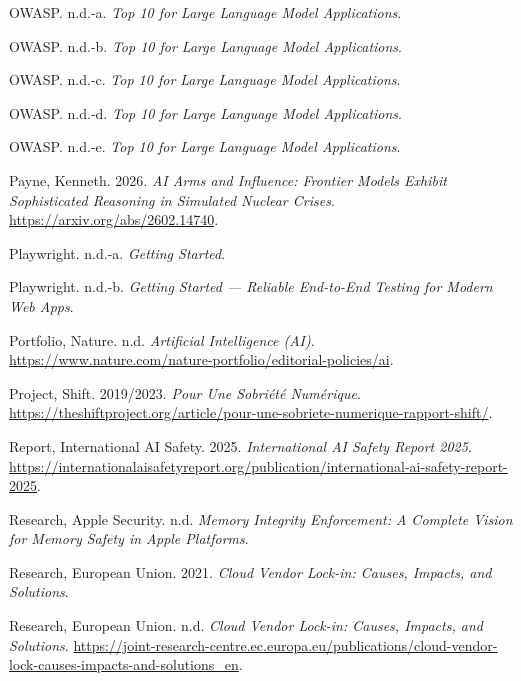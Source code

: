 \documentclass[
  10pt,
  a4paper,
  DIV=11,
  numbers=noendperiod,
  oneside]{scrreprt}
\newlength{\cslhangindent}
\newenvironment{CSLReferences}[2] %
 {\begin{list}{}{%
  \setlength{\itemindent}{0pt}
  \setlength{\leftmargin}{0pt}
  \setlength{\parsep}{0pt}
  \ifodd #1
   \setlength{\leftmargin}{\cslhangindent}
   \setlength{\itemindent}{-1\cslhangindent}
  \fi
  \setlength{\itemsep}{#2\baselineskip}}}
 {\end{list}}
\let\oldemph\emph
\renewcommand{\emph}[1]{\oldemph{\textcolor{cmmgray}{#1}}}
\begin{document}
\begin{CSLReferences}{1}{1}
OWASP. n.d.-a. \emph{Top 10 for Large Language Model Applications}.

OWASP. n.d.-b. \emph{Top 10 for Large Language Model Applications}.

OWASP. n.d.-c. \emph{Top 10 for Large Language Model Applications}.

OWASP. n.d.-d. \emph{Top 10 for Large Language Model Applications}.

OWASP. n.d.-e. \emph{Top 10 for Large Language Model Applications}.

Payne, Kenneth. 2026. \emph{AI Arms and Influence: Frontier Models
Exhibit Sophisticated Reasoning in Simulated Nuclear Crises}.
\url{https://arxiv.org/abs/2602.14740}.

Playwright. n.d.-a. \emph{Getting Started}.

Playwright. n.d.-b. \emph{Getting Started --- Reliable End-to-End
Testing for Modern Web Apps}.

Portfolio, Nature. n.d. \emph{Artificial Intelligence (AI)}.
\url{https://www.nature.com/nature-portfolio/editorial-policies/ai}.

Project, Shift. 2019/2023. \emph{Pour Une Sobriété Numérique}.
\url{https://theshiftproject.org/article/pour-une-sobriete-numerique-rapport-shift/}.

Report, International AI Safety. 2025. \emph{International AI Safety
Report 2025}.
\url{https://internationalaisafetyreport.org/publication/international-ai-safety-report-2025}.

Research, Apple Security. n.d. \emph{Memory Integrity Enforcement: A
Complete Vision for Memory Safety in Apple Platforms}.

Research, European Union. 2021. \emph{Cloud Vendor Lock-in: Causes,
Impacts, and Solutions}.

Research, European Union. n.d. \emph{Cloud Vendor Lock-in: Causes,
Impacts, and Solutions}.
\url{https://joint-research-centre.ec.europa.eu/publications/cloud-vendor-lock-causes-impacts-and-solutions_en}.


\end{CSLReferences}
\end{document}
